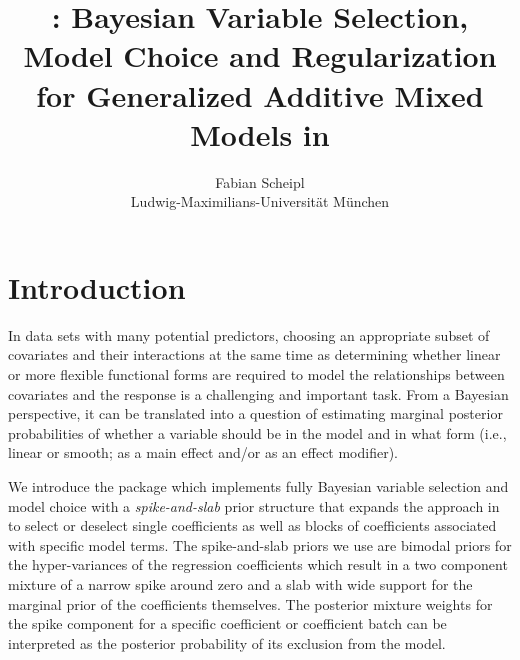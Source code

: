 \documentclass[article, shortnames, nojss, noheadings, notitle]{jss}
\title{\pkg{spikeSlabGAM}: Bayesian Variable Selection, Model Choice and Regularization for Generalized
    Additive Mixed Models in \proglang{R}}
\author{Fabian Scheipl \\ Ludwig-Maximilians-Universit\"at M\"unchen}
\begin{document}




\maketitle


\section{Introduction}

In data sets with many potential predictors, choosing an appropriate
subset of covariates and their interactions at the same time as
determining whether linear or more flexible functional forms are
required to model the relationships between covariates and the response
is a challenging and important task.
From a Bayesian perspective, it
can be translated into a question of estimating marginal posterior
probabilities of whether a variable should be in the model and in what
form (i.e., linear or smooth; as a main effect and/or as an effect
modifier).

We introduce the  \citep{R} package  which implements fully Bayesian variable selection and
model choice with a \emph{spike-and-slab} prior
structure that expands the approach in \citet{Ishwaran:2005} to select or deselect single
coefficients as well as blocks of coefficients associated with specific model terms.
The spike-and-slab priors we use are bimodal priors for the hyper-variances of the
regression coefficients which result in a two component mixture of a narrow spike around zero and a slab with wide support
for the marginal prior of the coefficients themselves.
The posterior mixture weights for the
spike component  for a specific coefficient or coefficient batch can be interpreted
as the posterior probability of its exclusion from the model.
\end{document}
